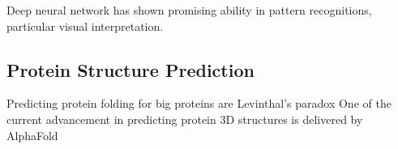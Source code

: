 Deep neural network has shown promising ability in pattern recognitions, particular visual interpretation.
\par 

\subsection{Protein Structure Prediction}
Predicting protein folding for big proteins are Levinthal's paradox One of the current advancement in predicting protein 3D structures is delivered by AlphaFold